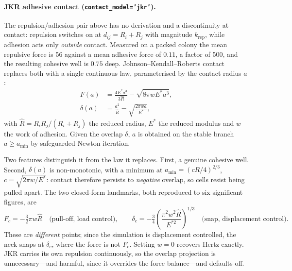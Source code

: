 \documentclass[11pt]{article}
\begin{document}
\paragraph{JKR adhesive contact (\texttt{contact\_model='jkr'}).} The
repulsion/adhesion pair above has no derivation and a discontinuity at contact:
repulsion switches on at $d_{ij}=R_i+R_j$ with magnitude $k_{\text{rep}}$, while
adhesion acts only \emph{outside} contact. Measured on a packed colony the mean
repulsive force is $56$ against a mean adhesive force of $0.11$, a factor of
$500$, and the resulting cohesive well is $0.75$ deep. Johnson--Kendall--Roberts
contact replaces both with a single continuous law, parameterised by the contact
radius $a$:
\begin{align}
  F(a)      &= \frac{4E^\ast a^3}{3\hat R} - \sqrt{8\pi w E^\ast a^3},\\
  \delta(a) &= \frac{a^2}{\hat R} - \sqrt{\frac{2\pi w a}{E^\ast}},
\end{align}
with $\hat R = R_iR_j/(R_i+R_j)$ the reduced radius, $E^\ast$ the reduced modulus
and $w$ the work of adhesion. Given the overlap $\delta$, $a$ is obtained on the
stable branch $a\ge a_{\min}$ by safeguarded Newton iteration.

Two features distinguish it from the law it replaces. First, a genuine cohesive
well. Second, $\delta(a)$ is non-monotonic, with a minimum at
$a_{\min}=(cR/4)^{2/3}$, $c=\sqrt{2\pi w/E^\ast}$: contact therefore persists to
\emph{negative} overlap, so cells resist being pulled apart. The two closed-form
landmarks, both reproduced to six significant figures, are
\begin{equation}
  F_c = -\tfrac{3}{2}\pi w \hat R \quad\text{(pull-off, load control)},\qquad
  \delta_c = -\tfrac{3}{4}\left(\frac{\pi^2w^2\hat R}{E^{\ast 2}}\right)^{1/3}
  \quad\text{(snap, displacement control)} .
\end{equation}
These are \emph{different} points; since the simulation is displacement
controlled, the neck snaps at $\delta_c$, where the force is not $F_c$. Setting
$w=0$ recovers Hertz exactly. JKR carries its own repulsion continuously, so the
overlap projection is unnecessary---and harmful, since it overrides the force
balance---and defaults off.
\end{document}
